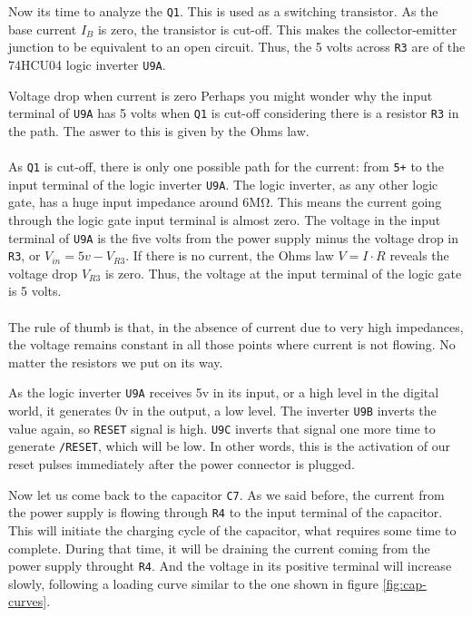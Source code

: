Now its time to analyze the  {\tt Q1}. This is used as a switching transistor. As the base current $I_B$ is zero, the transistor is cut-off. This makes the collector-emitter junction to be equivalent to an open circuit. Thus, the 5 volts across {\tt R3} are  of the 74HCU04 logic inverter {\tt U9A}.

\begin{theory}[h]{Voltage drop when current is zero}
  Perhaps you might wonder why the input terminal of {\tt U9A} has 5 volts when {\tt Q1} is cut-off considering there is a resistor {\tt R3} in the path. The aswer to this is given by the Ohms law.\\\\

  As {\tt Q1} is cut-off, there is only one possible path for the current: from {\tt 5+} to the input terminal of the logic inverter {\tt U9A}. The logic inverter, as any other logic gate, has a huge input impedance around 6M\si{\ohm}. This means the current going through the logic gate input terminal is almost zero. The voltage in the input terminal of {\tt U9A} is the five volts from the power supply minus the voltage drop in {\tt R3}, or $V_{in} = 5v - V_{R3}$. If there is no current, the Ohms law $V=I \cdot R$ reveals the voltage drop $V_{R3}$ is zero. Thus, the voltage at the input terminal of the logic gate is 5 volts.\\\\

  The rule of thumb is that, in the absence of current due to very high impedances, the voltage remains constant in all those points where current is not flowing. No matter the resistors we put on its way.
\end{theory}

As the logic inverter {\tt U9A} receives 5v in its input, or a high level in the digital world, it generates 0v in the output, a low level. The inverter {\tt U9B} inverts the value again, so {\tt RESET} signal is high. {\tt U9C} inverts that signal one more time to generate {\tt /RESET}, which will be low. In other words, this is the activation of our reset pulses immediately after the power connector is plugged.

Now let us come back to the capacitor {\tt C7}. As we said before, the current from the power supply is flowing through {\tt R4} to the input terminal of the capacitor. This will initiate the charging cycle of the capacitor, what requires some time to complete. During that time, it will be draining the current coming from the power supply throught {\tt R4}. And the voltage in its positive terminal will increase slowly, following a loading curve similar to the one shown in figure \ref{fig:cap-curves}.

